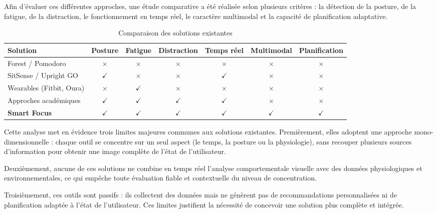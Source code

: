 Afin d’évaluer ces différentes approches, une étude comparative a été réalisée selon plusieurs critères : la détection de la posture, de la fatigue, de la distraction, le fonctionnement en temps réel, le caractère multimodal et la capacité de planification adaptative.

\begin{table}[H]
\centering
\begin{tabular}{|l|c|c|c|c|c|c|}
\hline
\textbf{Solution} & \textbf{Posture} & \textbf{Fatigue} & \textbf{Distraction} & \textbf{Temps réel} & \textbf{Multimodal} & \textbf{Planification} \\
\hline
Forest / Pomodoro        & $\times$ & $\times$ & $\times$ & $\times$ & $\times$ & $\times$ \\
\hline
SitSense / Upright GO    & $\checkmark$ & $\times$ & $\times$ & $\checkmark$ & $\times$ & $\times$ \\
\hline
Wearables (Fitbit, Oura) & $\times$ & $\checkmark$ & $\times$ & $\times$ & $\times$ & $\times$ \\
\hline
Approches académiques    & $\checkmark$ & $\checkmark$ & $\checkmark$ & $\checkmark$ & $\times$ & $\times$ \\
\hline
\textbf{Smart Focus}     & $\checkmark$ & $\checkmark$ & $\checkmark$ & $\checkmark$ & $\checkmark$ & $\checkmark$ \\
\hline
\end{tabular}
\caption{Comparaison des solutions existantes}
\label{tab:comparaison_solutions_existantes}
\end{table}

Cette analyse met en évidence trois limites majeures communes aux solutions existantes. Premièrement, elles adoptent une approche mono-dimensionnelle : chaque outil se concentre sur un seul aspect (le temps, la posture ou la physiologie), sans recouper plusieurs sources d’information pour obtenir une image complète de l’état de l’utilisateur.

Deuxièmement, aucune de ces solutions ne combine en temps réel l’analyse comportementale visuelle avec des données physiologiques et environnementales, ce qui empêche toute évaluation fiable et contextuelle du niveau de concentration.

Troisièmement, ces outils sont passifs : ils collectent des données mais ne génèrent pas de recommandations personnalisées ni de planification adaptée à l’état de l’utilisateur. Ces limites justifient la nécessité de concevoir une solution plus complète et intégrée.

